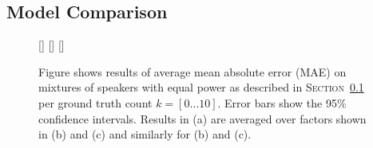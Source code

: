 
\subsection{Model Comparison}%
\label{ssec:model_comparsion}

\begin{figure}
\centering
{}
[\textwidth]{}%
\hspace{0.2\textwidth} %
[\textwidth]{}%
\hspace{0.2\textwidth} %
[\textwidth]{}%
\caption[Short Caption]{Figure shows results of average mean absolute error (MAE) on mixtures of speakers with equal power as described in \textsc{Section~\ref{ssec:model_comparsion}} per ground truth count \(k=[0\ldots10]\). Error bars show the 95\% confidence intervals. Results in (a) are averaged over factors shown in (b) and (c) and similarly for (b) and (c).}
\label{fig:fixed-gain-results}
\end{figure}

%
%         
%         

